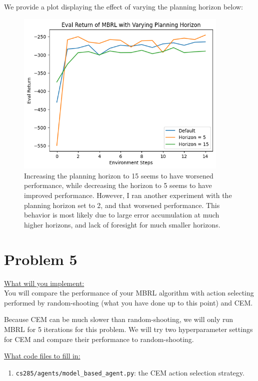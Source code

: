 \documentclass{article} %
\begin{document}
\begin{sol}
  We provide a plot displaying the effect of varying the planning horizon below:
  \begin{figure}[ht!]
    \color{darkblue}
  \begin{center}
    \includegraphics[width=4in]{images/q4/horizon.png}
  \end{center}
  \caption{Increasing the planning horizon to 15 seems to have worsened performance, while decreasing the horizon to 5 seems to have improved performance. However, I ran another experiment with the planning horizon set to 2, and that worsened performance. This behavior is most likely due to large error accumulation at much higher horizons, and lack of foresight for much smaller horizons.}
\end{figure}
\end{sol}


\newpage

\section*{Problem 5}

\underline{What will you implement:}\\ 
You will compare the performance of your MBRL algorithm with action selecting performed by random-shooting (what you have done up to this point) and CEM.

Because CEM can be much slower than random-shooting, we will only run MBRL for 5 iterations for this problem. We will try two hyperparameter settings for CEM and compare their performance to random-shooting.

\underline{What code files to fill in:}
\begin{enumerate}
    \item \verb+cs285/agents/model_based_agent.py+: the CEM action selection strategy.
\end{enumerate}
\end{document}
